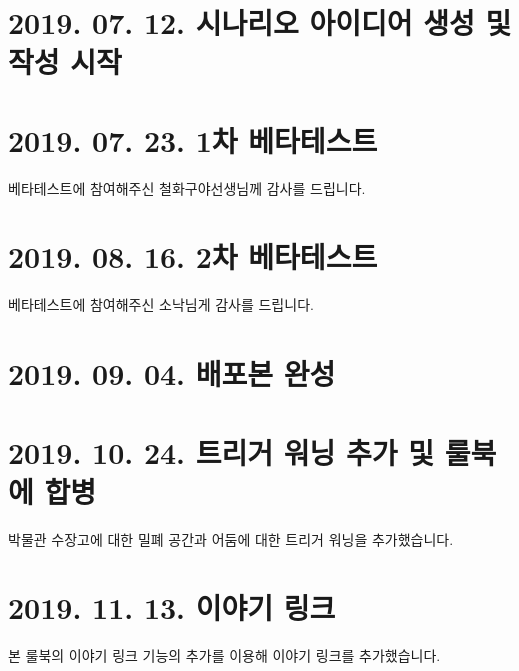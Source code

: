 \documentclass{report}
\begin{document}
	\section*{2019. 07. 12. 시나리오 아이디어 생성 및 작성 시작}
	
	\section*{2019. 07. 23. 1차 베타테스트}
	베타테스트에 참여해주신 철화구야선생님께 감사를 드립니다.
	
	\section*{2019. 08. 16. 2차 베타테스트}
	베타테스트에 참여해주신 소낙님게 감사를 드립니다.
	
	\section*{2019. 09. 04. 배포본 완성}
	
	\section*{2019. 10. 24. 트리거 워닝 추가 및 룰북에 합병}
	박물관 수장고에 대한 밀폐 공간과 어둠에 대한 트리거 워닝을 추가했습니다.
	
	\section*{2019. 11. 13. 이야기 링크}
	본 룰북의 이야기 링크 기능의 추가를 이용해 이야기 링크를 추가했습니다.
\end{document}
